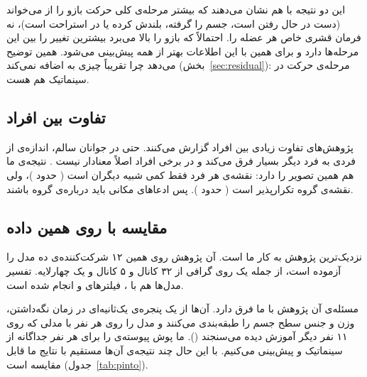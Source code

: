 این دو نتیجه با هم نشان می‌دهند که  بیشتر مرحله‌ی کلی حرکت بازو را از  می‌خواند (دست در حال رفتن است، جسم را گرفته، بلندش کرده یا در استراحت است)، نه فرمان قشری خاص هر عضله را. احتمالاً  که بازو را بالا می‌برد بیشترین تغییر را بین این مرحله‌ها دارد و برای همین با این اطلاعات بهتر از همه پیش‌بینی می‌شود. همین توضیح می‌دهد چرا  تقریباً چیزی به  اضافه نمی‌کند (بخش~\ref{sec:residual}): مرحله‌ی حرکت در سینماتیک هم هست.

\subsection{تفاوت بین افراد}

پژوهش‌های  تفاوت زیادی بین افراد گزارش می‌کنند. حتی در جوانان سالم، اندازه‌ی  از فردی به فرد دیگر بسیار فرق می‌کند و در برخی افراد اصلاً معنادار نیست \cite{ushiyama2011,matsuya2017}. نتیجه‌ی ما هم همین تصویر را دارد: نقشه‌ی هر فرد فقط کمی شبیه دیگران است ( حدود )، ولی نقشه‌ی گروه تکرارپذیر است ( حدود ). پس ادعاهای مکانی باید درباره‌ی گروه باشند.

\subsection{مقایسه با  روی همین داده}

نزدیک‌ترین پژوهش به کار ما \cite{pintoneto2026} است. آن پژوهش روی همین ۱۲ شرکت‌کننده‌ی  ده مدل را آزموده است، از جمله یک  روی گرافی از ۳۲ کانال  و ۵ کانال  و یک  چهارلایه. تفسیر مدل‌ها هم با ، فیلترهای  و  انجام شده است.

مسئله‌ی آن پژوهش با ما فرق دارد. آن‌ها از یک پنجره‌ی یک‌ثانیه‌ای در زمان نگه‌داشتن، وزن و جنس سطح جسم را طبقه‌بندی می‌کنند و مدل را روی هر نفر با مدلی که روی ۱۱ نفر دیگر آموزش دیده می‌سنجند (). ما پوش پیوسته‌ی  را برای هر نفر جداگانه از سینماتیک و  پیش‌بینی می‌کنیم. با این حال چند نتیجه‌ی آن‌ها مستقیم با نتایج ما قابل مقایسه است (جدول~\ref{tab:pinto}).

